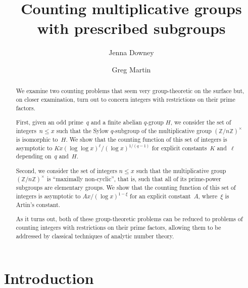 \documentclass[12pt,reqno]{amsart}
\theoremstyle{definition}
\newcommand{\Z}{{\mathbb Z}}
\begin{document}
\title{Counting multiplicative groups with prescribed subgroups}
\author{Jenna Downey}
\address{Department of Mathematics and Statistics \\ C245 (Science Building) \\ 1000 KLO Road \\ Kelowna, BC, Canada \ V1Y 4X8}
\author{Greg Martin}
\address{Department of Mathematics \\ University of British Columbia \\ Room 121, 1984 Mathematics Road \\ Vancouver, BC, Canada \ V6T 1Z2}
\maketitle

\begin{abstract}
We examine two counting problems that seem very group-theoretic on the surface but, on closer examination, turn out to concern integers with restrictions on their prime factors.

First, given an odd prime~$q$ and a finite abelian $q$-group $H$, we consider the set of integers~$n\le x$ such that the Sylow $q$-subgroup of the multiplicative group $(\Z/n\Z)^\times$ is isomorphic to~$H$. We show that the counting function of this set of integers is asymptotic to $K x(\log\log x)^\ell/(\log x)^{1/(q-1)}$ for explicit constants~$K$ and~$\ell$ depending on~$q$ and~$H$.

Second, we consider the set of integers $n\le x$ such that the multiplicative group $(\Z/n\Z)^\times$ is ``maximally non-cyclic'', that is, such that all of its prime-power subgroups are elementary groups. We show that the counting function of this set of integers is asymptotic to $A x/(\log x)^{1-\xi}$ for an explicit constant~$A$, where~$\xi$ is Artin's constant.

As it turns out, both of these group-theoretic problems can be reduced to problems of counting integers with restrictions on their prime factors, allowing them to be addressed by classical techniques of analytic number theory.
\end{abstract}

\renewcommand{\labelenumi}{(\alph{enumi})}


\section{Introduction}
\end{document}
